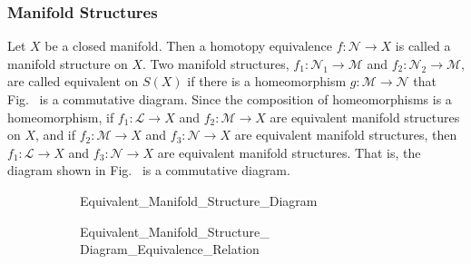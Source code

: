 \documentclass[crop=false,class=book,oneside]{standalone}
\begin{document}
        \subsubsection{Manifold Structures}
            Let $X$ be a closed manifold. Then a homotopy
            equivalence $f:\mathcal{N}\rightarrow{X}$ is called a
            manifold structure on $X$. Two manifold structures,
            $f_{1}:\mathcal{N}_{1}\rightarrow{\mathcal{M}}$ and
            $f_{2}:\mathcal{N}_{2}\rightarrow{\mathcal{M}}$, are called
            equivalent on $S(X)$ if there is a homeomorphism
            $g:\mathcal{M}\rightarrow\mathcal{N}$ that
            Fig.~
            is a commutative diagram. Since the composition of homeomorphisms
            is a homeomorphism, if $f_{1}:\mathcal{L}\rightarrow{X}$ and
            $f_{2}:\mathcal{M}\rightarrow{X}$ are equivalent manifold structures
            on $X$, and if $f_{2}:\mathcal{M}\rightarrow{X}$
            and $f_{3}:\mathcal{N}\rightarrow{X}$ are equivalent
            manifold structures, then $f_{1}:\mathcal{L}\rightarrow{X}$
            and $f_{3}:\mathcal{N}\rightarrow{X}$ are equivalent manifold
            structures. That is, the diagram shown in
            Fig.~
            is a commutative diagram.
            \begin{figure}[H]
                \captionsetup{type=figure}
                \begin{subfigure}[b]{0.49\textwidth}
                    \centering
                    \captionsetup{type=figure}
                    
                              {Equivalent_Manifold_Structure_Diagram}
                    \label{fig:Surgery_Theory_Equivalent_Manifold_Structure_Diagram}
                \end{subfigure}
                \begin{subfigure}[b]{0.49\textwidth}
                    \centering
                    \captionsetup{type=figure}
                    
                              {Equivalent_Manifold_Structure_%
                               Diagram_Equivalence_Relation}
                    \label{fig:Surgery_Theory_Equivalent_%
                           Manifold_Structure_Diagram_Equivalence_Relation}
                \end{subfigure}
                \label{Commutative Diagrams for Manifold Structures.}
                \label{fig:Commutative_Diagrams_for_Manifold_Structures}
            \end{figure}
\end{document}

